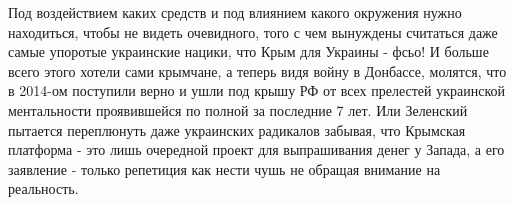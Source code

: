Под воздействием каких средств и под влиянием какого окружения нужно
находиться, чтобы не видеть очевидного, того с чем вынуждены считаться даже
самые упоротые украинские нацики, что Крым для Украины - фсьо! И больше всего
этого хотели сами крымчане, а теперь видя войну в Донбассе, молятся, что в
2014-ом поступили верно и ушли под крышу РФ от всех прелестей украинской
ментальности проявившейся по полной за последние 7 лет. Или Зеленский пытается
переплюнуть даже украинских радикалов забывая, что Крымская платформа - это
лишь очередной проект для выпрашивания денег у Запада, а его заявление - только
репетиция как нести чушь не обращая внимание на реальность.
